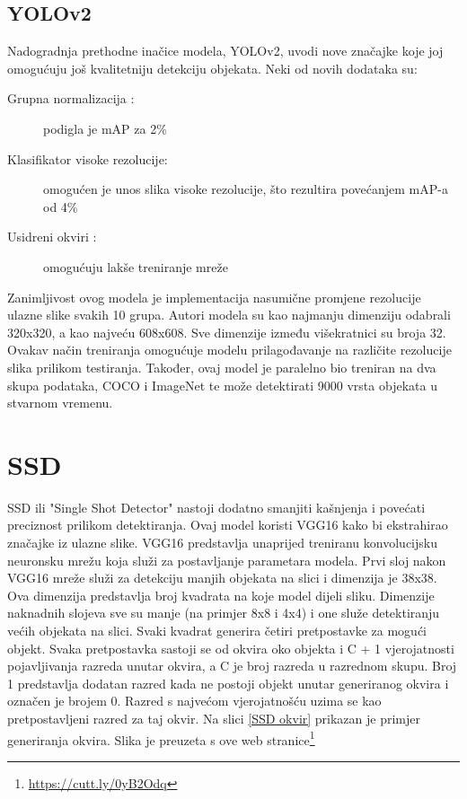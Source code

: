 \subsection{YOLOv2}
Nadogradnja prethodne inačice modela, YOLOv2, uvodi nove značajke koje joj omogućuju još kvalitetniju detekciju objekata.\newline
Neki od novih dodataka su:
\begin{description}
    \item [Grupna normalizacija :]podigla je mAP za 2\%
    \item [Klasifikator visoke rezolucije:]omogućen je unos slika visoke rezolucije, što rezultira povećanjem mAP-a od 4\%
    \item [Usidreni okviri :]omogućuju lakše treniranje mreže
\end{description}

Zanimljivost ovog modela je implementacija nasumične promjene rezolucije ulazne slike svakih 10 grupa.
Autori modela su kao najmanju dimenziju odabrali 320x320, a 
kao najveću 608x608. Sve dimenzije između višekratnici su broja 32. \newline
Ovakav način treniranja omogućuje modelu prilagođavanje na različite rezolucije 
slika prilikom testiranja. \newline
Također, ovaj model je paralelno bio treniran na dva skupa podataka, COCO i ImageNet te može 
detektirati 9000 vrsta objekata u stvarnom vremenu. \citep{DBLP:journals/corr/RedmonF16}


\section{SSD}
SSD ili "Single Shot Detector" nastoji dodatno smanjiti kašnjenja i povećati preciznost prilikom detektiranja. 
Ovaj model koristi VGG16 kako bi ekstrahirao značajke iz ulazne slike. VGG16 predstavlja unaprijed treniranu konvolucijsku neuronsku mrežu koja služi za postavljanje 
parametara modela. 
Prvi sloj nakon VGG16 mreže služi za detekciju manjih objekata na slici i dimenzija je 38x38. Ova dimenzija predstavlja broj kvadrata na koje model dijeli sliku. 
Dimenzije naknadnih slojeva sve su manje (na primjer 8x8 i 4x4) i one služe detektiranju većih objekata na slici. 
Svaki kvadrat generira četiri pretpostavke za mogući objekt. Svaka pretpostavka sastoji se od okvira oko objekta 
i C + 1 vjerojatnosti pojavljivanja razreda unutar okvira, a C je broj razreda u razrednom skupu. Broj 1 predstavlja dodatan razred
kada ne postoji objekt unutar generiranog okvira i označen je brojem 0. Razred s najvećom vjerojatnošću uzima se kao pretpostavljeni razred 
za taj okvir. Na slici \ref{SSD okvir} prikazan je primjer generiranja okvira. Slika je preuzeta s ove web stranice\footnote{\url{https://cutt.ly/0yB2Odq}}


